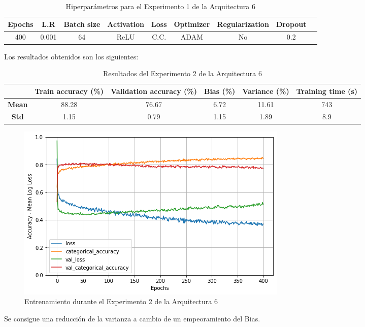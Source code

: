 \documentclass{article}
\begin{document}
            \begin{table}[!h]
				\begin{tabular}{|c|c|c|c|c|c|c|c|c|}
					\textbf{Epochs}&\textbf{L.R}&\textbf{Batch size}&\textbf{Activation}&\textbf{Loss}&\textbf{Optimizer}&\textbf{Regularization}&\textbf{Dropout}   \\ \hline
					400 & 0.001 & 64 & ReLU & C.C. & ADAM & No & 0.2 
				\end{tabular}
				\caption{Hiperpar\'ametros para el Experimento 1 de la Arquitectura 6}
				\label{tab:hip-a6-e2}
			\end{table}
   
            Los resultados obtenidos son los siguientes: 
            \begin{table}[!h]
				\begin{center}
					\begin{tabular}{ c | c | c | c | c | c |}
						\ & \textbf{Train accuracy (\%)} & \textbf{Validation accuracy (\%)} & \textbf{Bias (\%)} & \textbf{Variance (\%)} & \textbf{Training time (s)} \\ \hline
						\textbf{Mean} & 88.28  & 76.67 & 6.72 & 11.61 & 743  \\ \hline
						\textbf{Std} & 1.15  & 0.79 & 1.15 & 1.89 & 8.9  \\ \hline
					\end{tabular}
					\caption{Resultados del Experimento 2 de la Arquitectura 6}
					\label{tab:res-a2-e5}
				\end{center}
			\end{table}
            \begin{figure}[!h]
				\begin{center}
					\includegraphics[scale=0.5]{tr-a6-e2.png}		
					\caption{Entrenamiento durante el Experimento 2 de la Arquitectura 6}	
					\label{tab:tr-a6-e2}
				\end{center}
			\end{figure}
            Se consigue una reducci\'on de la varianza a cambio de un empeoramiento del Bias. 
        
\end{document}

